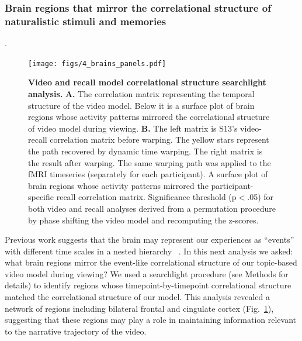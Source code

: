 \documentclass{article}
\begin{document}
\subsubsection*{Brain regions that mirror the correlational structure of naturalistic stimuli and memories}.
\begin{figure}[t!]
\centering
\texttt{[image: figs/4\_brains\_panels.pdf]}
\caption{\small \textbf{Video and recall model correlational structure searchlight analysis.} \textbf{A.} The correlation matrix representing the temporal structure of the video model. Below it is a surface plot of brain regions whose activity patterns mirrored the correlational structure of video model during viewing.  \textbf{B.} The left matrix is S13's video-recall correlation matrix before warping. The yellow stars represent the path recovered by dynamic time warping. The right matrix is the result after warping. The same warping path was applied to the fMRI timeseries (separately for each participant). A surface plot of brain regions whose activity patterns mirrored the participant-specific recall correlation matrix. Significance threshold (p$<$.05) for both video and recall analyses derived from a permutation procedure by phase shifting the video model and recomputing the z-scores.}
\label{fig:brainz}
\end{figure}

Previous work suggests that the brain may represent our experiences as ``events'' with different time scales in a nested hierarchy ~\citep{LernEtal11, ChenEtal17, BaldEtal17}. In this next analysis we asked: what brain regions mirror the event-like correlational structure of our topic-based video model during viewing? We used a searchlight procedure (see Methods for details) to identify regions whose timepoint-by-timepoint correlational structure matched the correlational structure of our model. This analysis revealed a network of regions including bilateral frontal and cingulate cortex (Fig.~\ref{fig:brainz}), suggesting that these regions may play a role in maintaining information relevant to the narrative trajectory of the video.
\end{document}
